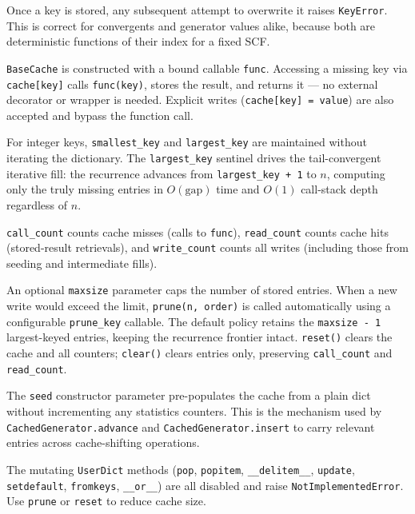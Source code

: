 \begin{description}[style=nextline]
  \item[Immutability after write.]
    Once a key is stored, any subsequent attempt to overwrite it raises
    \texttt{KeyError}.  This is correct for convergents and generator values
    alike, because both are deterministic functions of their index for a fixed SCF.

  \item[Self-computing on miss.]
    \texttt{BaseCache} is constructed with a bound callable \texttt{func}.
    Accessing a missing key via \texttt{cache[key]} calls \texttt{func(key)},
    stores the result, and returns it — no external decorator or wrapper is
    needed.  Explicit writes (\texttt{cache[key] = value}) are also accepted
    and bypass the function call.

  \item[Key-range tracking.]
    For integer keys, \texttt{smallest\_key} and \texttt{largest\_key}
    are maintained without iterating the dictionary.
    The \texttt{largest\_key} sentinel drives the tail-convergent iterative
    fill: the recurrence advances from \texttt{largest\_key + 1} to $n$,
    computing only the truly missing entries in $O(\text{gap})$ time and
    $O(1)$ call-stack depth regardless of $n$.

  \item[Usage statistics.]
    \texttt{call\_count} counts cache misses (calls to \texttt{func}),
    \texttt{read\_count} counts cache hits (stored-result retrievals), and
    \texttt{write\_count} counts all writes (including those from seeding
    and intermediate fills).

  \item[Capacity management.]
    An optional \texttt{maxsize} parameter caps the number of stored entries.
    When a new write would exceed the limit, \texttt{prune(n, order)} is
    called automatically using a configurable \texttt{prune\_key} callable.
    The default policy retains the \texttt{maxsize\,-\,1} largest-keyed
    entries, keeping the recurrence frontier intact.  \texttt{reset()} clears
    the cache and all counters; \texttt{clear()} clears entries only, preserving
    \texttt{call\_count} and \texttt{read\_count}.

  \item[Construction-time seeding.]
    The \texttt{seed} constructor parameter pre-populates the cache from a
    plain dict without incrementing any statistics counters.  This is the
    mechanism used by \texttt{CachedGenerator.advance} and
    \texttt{CachedGenerator.insert} to carry relevant entries across
    cache-shifting operations.

  \item[Blocked mutation methods.]
    The mutating \texttt{UserDict} methods (\texttt{pop}, \texttt{popitem},
    \texttt{\_\_delitem\_\_}, \texttt{update}, \texttt{setdefault},
    \texttt{fromkeys}, \texttt{\_\_or\_\_}) are all disabled and raise
    \texttt{NotImplementedError}.  Use \texttt{prune} or \texttt{reset} to
    reduce cache size.
\end{description}

